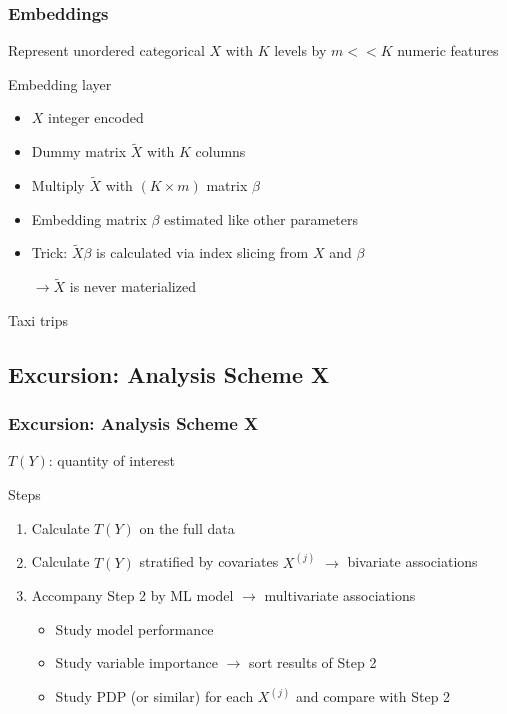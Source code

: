 \begin{frame}
	\frametitle{Embeddings}
	Represent unordered categorical $X$ with $K$ levels by $m << K$ numeric features
	
	\vfill
	
	\begin{block}{Embedding layer}
		\begin{itemize}
			\item $X$ integer encoded
			\item Dummy matrix $\tilde X$ with $K$ columns
			\item Multiply $\tilde X$ with $(K \times m)$ matrix $\beta$
			\item Embedding matrix $\beta$ estimated like other parameters
			\item Trick: $\tilde X \beta$ is calculated via index slicing from $X$ and $\beta$
			
			$\rightarrow \tilde X$ is never materialized
		\end{itemize}
	\end{block}
	
	\vfill
	
	\begin{example}
		Taxi trips
	\end{example}
\end{frame}

\subsection{Excursion: Analysis Scheme X}

\begin{frame}
	\frametitle{Excursion: Analysis Scheme X}
	$T(Y)$: quantity of interest
	
	\vfill
	
	\begin{block}{Steps}
		\begin{enumerate}
			\item Calculate $T(Y)$ on the full data
			\item Calculate $T(Y)$ stratified by covariates $X^{(j)}$ $\rightarrow$ bivariate associations
			\item Accompany Step 2 by ML model $\rightarrow$ multivariate associations
			\begin{itemize}
				\item Study model performance
				\item Study variable importance $\rightarrow$ sort results of Step 2
				\item Study PDP (or similar) for each $X^{(j)}$ and compare with Step 2
			\end{itemize}
		\end{enumerate}
	\end{block}
	
	\vfill
	
	\begin{example}
	\end{example}
\end{frame}

